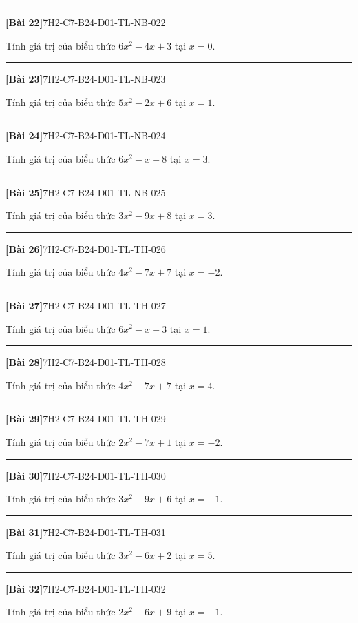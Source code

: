 \documentclass[12pt,a4paper]{article}
\newif\ifloigiai
\newenvironment{cauhoi}[2]{%
  \par\medskip\noindent\rule{\textwidth}{0.4pt}\par\nopagebreak
  \noindent\textbf{[#1]}\hfill{\scriptsize\ttfamily #2}\par\nopagebreak\smallskip}{\par}
\newcommand{\loigiai}[1]{\ifloigiai\par\smallskip\noindent\textit{Lời giải.} #1\par\fi}
\begin{document}
\begin{cauhoi}{Bài 22}{7H2-C7-B24-D01-TL-NB-022}
Tính giá trị của biểu thức $6x^{2}-4x+3$ tại $x=0$.
\loigiai{Thay $x=0$: $6\cdot(0)^{2}-4\cdot(0)+3=3$.}
\end{cauhoi}
\begin{cauhoi}{Bài 23}{7H2-C7-B24-D01-TL-NB-023}
Tính giá trị của biểu thức $5x^{2}-2x+6$ tại $x=1$.
\loigiai{Thay $x=1$: $5\cdot(1)^{2}-2\cdot(1)+6=9$.}
\end{cauhoi}
\begin{cauhoi}{Bài 24}{7H2-C7-B24-D01-TL-NB-024}
Tính giá trị của biểu thức $6x^{2}-x+8$ tại $x=3$.
\loigiai{Thay $x=3$: $6\cdot(3)^{2}-1\cdot(3)+8=59$.}
\end{cauhoi}
\begin{cauhoi}{Bài 25}{7H2-C7-B24-D01-TL-NB-025}
Tính giá trị của biểu thức $3x^{2}-9x+8$ tại $x=3$.
\loigiai{Thay $x=3$: $3\cdot(3)^{2}-9\cdot(3)+8=8$.}
\end{cauhoi}
\begin{cauhoi}{Bài 26}{7H2-C7-B24-D01-TL-TH-026}
Tính giá trị của biểu thức $4x^{2}-7x+7$ tại $x=-2$.
\loigiai{Thay $x=-2$: $4\cdot(-2)^{2}-7\cdot(-2)+7=37$.}
\end{cauhoi}
\begin{cauhoi}{Bài 27}{7H2-C7-B24-D01-TL-TH-027}
Tính giá trị của biểu thức $6x^{2}-x+3$ tại $x=1$.
\loigiai{Thay $x=1$: $6\cdot(1)^{2}-1\cdot(1)+3=8$.}
\end{cauhoi}
\begin{cauhoi}{Bài 28}{7H2-C7-B24-D01-TL-TH-028}
Tính giá trị của biểu thức $4x^{2}-7x+7$ tại $x=4$.
\loigiai{Thay $x=4$: $4\cdot(4)^{2}-7\cdot(4)+7=43$.}
\end{cauhoi}
\begin{cauhoi}{Bài 29}{7H2-C7-B24-D01-TL-TH-029}
Tính giá trị của biểu thức $2x^{2}-7x+1$ tại $x=-2$.
\loigiai{Thay $x=-2$: $2\cdot(-2)^{2}-7\cdot(-2)+1=23$.}
\end{cauhoi}
\begin{cauhoi}{Bài 30}{7H2-C7-B24-D01-TL-TH-030}
Tính giá trị của biểu thức $3x^{2}-9x+6$ tại $x=-1$.
\loigiai{Thay $x=-1$: $3\cdot(-1)^{2}-9\cdot(-1)+6=18$.}
\end{cauhoi}
\begin{cauhoi}{Bài 31}{7H2-C7-B24-D01-TL-TH-031}
Tính giá trị của biểu thức $3x^{2}-6x+2$ tại $x=5$.
\loigiai{Thay $x=5$: $3\cdot(5)^{2}-6\cdot(5)+2=47$.}
\end{cauhoi}
\begin{cauhoi}{Bài 32}{7H2-C7-B24-D01-TL-TH-032}
Tính giá trị của biểu thức $2x^{2}-6x+9$ tại $x=-1$.
\loigiai{Thay $x=-1$: $2\cdot(-1)^{2}-6\cdot(-1)+9=17$.}
\end{cauhoi}
\end{document}
